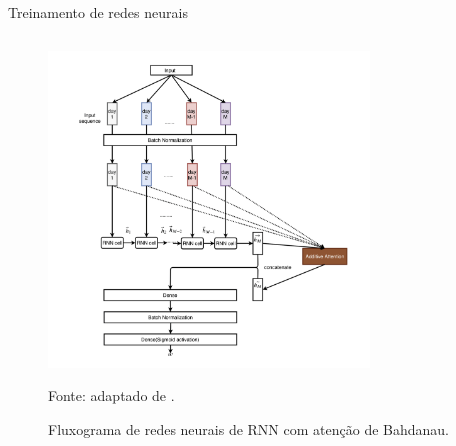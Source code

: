     \begin{frame}{Treinamento de redes neurais}

        
        \begin{columns}
            \begin{column}{0.5\textwidth}

                \begin{figure}[htp]
                    \centering
                    \caption{Fluxograma de redes neurais de RNN com atenção de Bahdanau.}
                    \label{fig:RNN_BauhAtt}
                    \includegraphics[width=0.8\textwidth]{./images/RNN_AddAtt.png}
                    \par \footnotesize Fonte: adaptado de \citeauthor{cao2020delafo}.
                \end{figure}

            \end{column}

            \begin{column}{0.5\textwidth}


\end{column}
\end{columns}
\end{frame}
